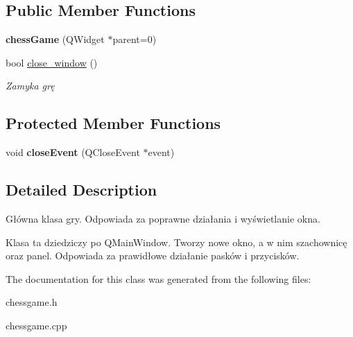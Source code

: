 \subsection*{Public Member Functions}
\begin{DoxyCompactItemize}
\item 
\mbox{\label{classchess_game_a9d6406de47a97ca52a4016a5caf9f598}} 
{\bfseries chess\+Game} (Q\+Widget $\ast$parent=0)
\item 
\mbox{\label{classchess_game_aec7014f597bf46b416324129cd9ed427}} 
bool \hyperlink{classchess_game_aec7014f597bf46b416324129cd9ed427}{close\+\_\+window} ()
\begin{DoxyCompactList}\small\item\em Zamyka grę \end{DoxyCompactList}\end{DoxyCompactItemize}
\subsection*{Protected Member Functions}
\begin{DoxyCompactItemize}
\item 
\mbox{\label{classchess_game_aa030ac566950d641e55f7d5b9d249f7c}} 
void {\bfseries close\+Event} (Q\+Close\+Event $\ast$event)
\end{DoxyCompactItemize}


\subsection{Detailed Description}
Główna klasa gry. Odpowiada za poprawne działania i wyświetlanie okna. 

Klasa ta dziedziczy po Q\+Main\+Window. Tworzy nowe okno, a w nim szachownicę oraz panel. Odpowiada za prawidłowe działanie pasków i przycisków. 

The documentation for this class was generated from the following files\+:\begin{DoxyCompactItemize}
\item 
chessgame.\+h\item 
chessgame.\+cpp\end{DoxyCompactItemize}
